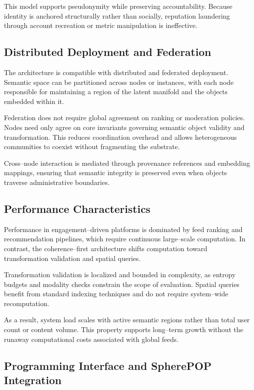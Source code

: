 \documentclass[11pt]{article}
\begin{document}
This model supports pseudonymity while preserving accountability. Because identity is
anchored structurally rather than socially, reputation laundering through account
recreation or metric manipulation is ineffective.

\subsection{Distributed Deployment and Federation}

The architecture is compatible with distributed and federated deployment. Semantic space
can be partitioned across nodes or instances, with each node responsible for maintaining a
region of the latent manifold and the objects embedded within it.

Federation does not require global agreement on ranking or moderation policies. Nodes need
only agree on core invariants governing semantic object validity and transformation. This
reduces coordination overhead and allows heterogeneous communities to coexist without
fragmenting the substrate.

Cross--node interaction is mediated through provenance references and embedding mappings,
ensuring that semantic integrity is preserved even when objects traverse administrative
boundaries.

\subsection{Performance Characteristics}

Performance in engagement--driven platforms is dominated by feed ranking and recommendation
pipelines, which require continuous large--scale computation. In contrast, the
coherence--first architecture shifts computation toward transformation validation and
spatial queries.

Transformation validation is localized and bounded in complexity, as entropy budgets and
modality checks constrain the scope of evaluation. Spatial queries benefit from standard
indexing techniques and do not require system--wide recomputation.

As a result, system load scales with active semantic regions rather than total user count
or content volume. This property supports long--term growth without the runaway
computational costs associated with global feeds.

\subsection{Programming Interface and SpherePOP Integration}
\end{document}
